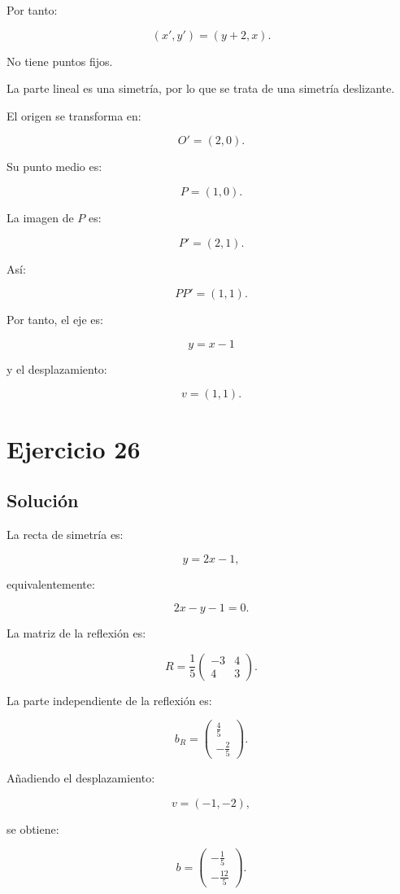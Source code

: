 \documentclass[11pt,a4paper]{article}
\begin{document}
Por tanto:

\[
(x',y')=(y+2,x).
\]

No tiene puntos fijos.

La parte lineal es una simetría, por lo que se trata de una simetría deslizante.

El origen se transforma en:

\[
O'=(2,0).
\]

Su punto medio es:

\[
P=(1,0).
\]

La imagen de \(P\) es:

\[
P'=(2,1).
\]

Así:

\[
PP'=(1,1).
\]

Por tanto, el eje es:

\[
\boxed{
y=x-1
}
\]

y el desplazamiento:

\[
\boxed{
v=(1,1).
}
\]

\section{Ejercicio 26}
\subsection{Solución}

La recta de simetría es:

\[
y=2x-1,
\]

equivalentemente:

\[
2x-y-1=0.
\]

La matriz de la reflexión es:

\[
R=
\frac15
\begin{pmatrix}
-3&4\\
4&3
\end{pmatrix}.
\]

La parte independiente de la reflexión es:

\[
b_R=
\begin{pmatrix}
\frac45\\[1mm]
-\frac25
\end{pmatrix}.
\]

Añadiendo el desplazamiento:

\[
v=(-1,-2),
\]

se obtiene:

\[
b=
\begin{pmatrix}
-\frac15\\[1mm]
-\frac{12}{5}
\end{pmatrix}.
\]
\end{document}
